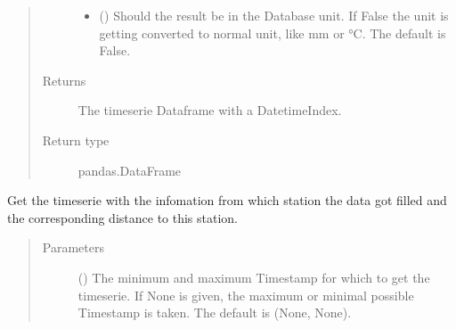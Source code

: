 \documentclass[letterpaper,10pt,english]{sphinxmanual}
\begin{document}
\begin{fulllineitems}
\begin{fulllineitems}
\begin{quote}
\begin{description}
\begin{itemize}
\item {} 
\sphinxAtStartPar
{} (\sphinxstyleliteralemphasis{\sphinxupquote{, }}) \textendash{} Should the result be in the Database unit.
If False the unit is getting converted to normal unit, like mm or °C.
The default is False.

\end{itemize}

\item[{Returns}] \leavevmode
\sphinxAtStartPar
The timeserie Dataframe with a DatetimeIndex.

\item[{Return type}] \leavevmode
\sphinxAtStartPar
pandas.DataFrame

\end{description}\end{quote}

\end{fulllineitems}


\begin{fulllineitems}
\label{\detokenize{weatherDB:weatherDB.station.StationBase.get_dist}}
\sphinxAtStartPar
Get the timeserie with the infomation from which station the data got filled and the corresponding distance to this station.
\begin{quote}\begin{description}
\item[{Parameters}] \leavevmode
\sphinxAtStartPar
{} ({\hyperref[\detokenize{weatherDB.lib:weatherDB.lib.utils.TimestampPeriod}]{}}\sphinxstyleliteralemphasis{\sphinxupquote{(}}\sphinxstyleliteralemphasis{\sphinxupquote{)}}\sphinxstyleliteralemphasis{\sphinxupquote{, }}) \textendash{} The minimum and maximum Timestamp for which to get the timeserie.
If None is given, the maximum or minimal possible Timestamp is taken.
The default is (None, None).


\end{description}
\end{quote}
\end{fulllineitems}
\end{fulllineitems}
\end{document}
